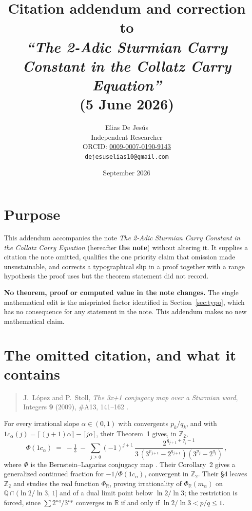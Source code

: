 \documentclass[10pt]{article}
\title{Citation addendum and correction to \\
\emph{``The 2-Adic Sturmian Carry Constant in the Collatz Carry Equation''} \\
{\normalsize (5 June 2026)}}
\author{Elias De Jes\'us\\
\small Independent Researcher\\
\small ORCID: \href{https://orcid.org/0009-0007-0190-9143}{0009-0007-0190-9143}\\
\small \texttt{dejesuselias10@gmail.com}}
\date{September 2026}
\newcommand{\Ztwo}{\mathbb{Z}_2}
\begin{document}
\maketitle\vspace{-2.5em}

\section*{Purpose}

This addendum accompanies the note \emph{The 2-Adic Sturmian Carry Constant in the Collatz Carry
Equation} \cite{dejesus2026sturmiancarry} (hereafter \textbf{the note}) without altering it. It
supplies a citation the note omitted, qualifies the one priority claim that omission made
unsustainable, and corrects a typographical slip in a proof together with a range hypothesis the
proof uses but the theorem statement did not record.

\textbf{No theorem, proof or computed value in the note changes.} The single mathematical edit is
the misprinted factor identified in Section~\ref{sec:typo}, which has no consequence for any
statement in the note. This addendum makes no new mathematical claim.

\section{The omitted citation, and what it contains}

\begin{quote}
J.~L\'opez and P.~Stoll, \emph{The 3x+1 conjugacy map over a Sturmian word}, Integers \textbf{9}
(2009), \#A13, 141--162 \cite{lopez2009conjugacy}.
\end{quote}

\noindent For every irrational slope $\alpha\in(0,1)$ with convergents $p_k/q_k$, and with
$1c_\alpha(j)=\lceil (j+1)\alpha\rceil-\lceil j\alpha\rceil$, their Theorem~1 gives, in $\Ztwo$,
\begin{equation}
\Phi(1c_\alpha) \;=\; -\tfrac13 \;-\; \sum_{j\ge 0} (-1)^{j+1}\,
\frac{2^{\,q_{j+1}+q_j-1}}{3\,(3^{p_{j+1}}-2^{q_{j+1}})(3^{p_j}-2^{q_j})}\,,
\label{eq:ls}
\end{equation}
where $\Phi$ is the Bernstein--Lagarias conjugacy map \cite{bernstein1996conjugacy}. Their
Corollary~2 gives a generalized continued fraction for $-1/\Phi(1c_\alpha)$, convergent in $\Ztwo$.
Their \S4 leaves $\Ztwo$ and studies the real function $\Phi_{\mathbb{R}}$, proving irrationality
of $\Phi_{\mathbb{R}}(m_\alpha)$ on $\mathbb{Q}\cap(\ln 2/\ln 3,\,1]$ and of a dual limit point
below $\ln 2/\ln 3$; the restriction is forced, since $\sum 2^{nq}/3^{np}$ converges in
$\mathbb{R}$ if and only if $\ln 2/\ln 3 < p/q \le 1$.
\end{document}
